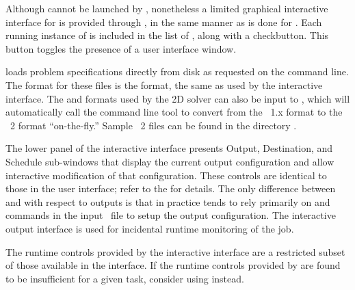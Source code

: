 Although  cannot be
launched by , nonetheless
a limited graphical interactive interface for  is provided
through , in the same manner as is done for .
Each running instance of  is included in the
 list of , along with a
checkbutton.  This button toggles the presence of a user interface
window.

 loads problem specifications directly from disk as
requested on the command line.  The format for these files is
the  format,
the same as used by the  interactive interface.  The
 and
formats used by the
2D solver  can also be input
to , which will automatically call the command line tool
 to convert from the \MIF~1.x format to the
\MIF~2 format ``on-the-fly.''  Sample \MIF~2 files can be found in
the directory .

The lower panel of the  interactive interface presents
Output, Destination, and Schedule sub-windows that display the current
output configuration and allow interactive modification of that
configuration.  These controls are identical to those in the 
user interface; refer to the
 for details.
The only difference between  and  with
respect to outputs is that in practice  tends to rely
primarily on
 and
 commands in the input
\MIF\ file
to setup the output configuration.  The interactive output interface is
used for incidental runtime monitoring of the job.

The runtime controls provided by the  interactive interface
are a restricted subset of those available in the  interface.
If the runtime controls provided by  are found to be
insufficient for a given task, consider using  instead.

